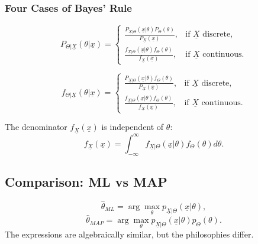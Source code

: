 \subsubsection{Four Cases of Bayes' Rule}
\begin{definition}
    \[
    P_{\Theta|\underline{X}}(\theta|\underline{x}) =
    \begin{cases}
        \frac{P_{\underline{X}|\Theta}(\underline{x}|\theta)P_\Theta(\theta)}{P_{\underline{X}}(\underline{x})}, & \text{if } \underline{X} \text{ discrete}, \\
        \frac{f_{\underline{X}|\Theta}(\underline{x}|\theta)f_\Theta(\theta)}{f_{\underline{X}}(\underline{x})}, & \text{if } \underline{X} \text{ continuous}.
    \end{cases}
    \]

    \[
    f_{\Theta|\underline{X}}(\theta|\underline{x}) =
    \begin{cases}
        \frac{P_{\underline{X}|\Theta}(\underline{x}|\theta)f_\Theta(\theta)}{P_{\underline{X}}(\underline{x})}, & \text{if } \underline{X} \text{ discrete}, \\
        \frac{f_{\underline{X}|\Theta}(\underline{x}|\theta)f_\Theta(\theta)}{f_{\underline{X}}(\underline{x})}, & \text{if } \underline{X} \text{ continuous}.
    \end{cases}
    \]
\end{definition}

\begin{notes}
    The denominator $f_{\underline{X}}(\underline{x})$ is independent of $\theta$:
    \[
    f_{\underline{X}}(\underline{x}) = \int_{-\infty}^{\infty} f_{\underline{X}|\Theta}(\underline{x}|\theta) f_\Theta(\theta) d\theta.
    \]
\end{notes}

\subsection{Comparison: ML vs MAP}
\begin{definition}
    \[
        \hat{\theta}_{ML} = \arg\max_{\theta} p_{\underline{X}|\Theta}(\underline{x}|\theta),
    \]
    \[
        \hat{\theta}_{MAP} = \arg\max_{\theta} p_{\underline{X}|\Theta}(\underline{x}|\theta)p_\Theta(\theta).
    \]
    The expressions are algebraically similar, but the philosophies differ.
\end{definition}

